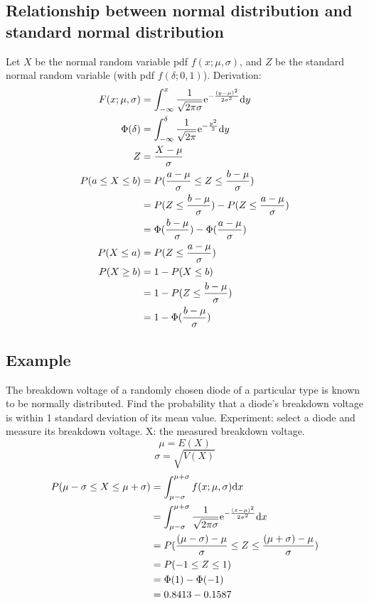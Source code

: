 \documentclass[letterpaper, 12pt]{math}
\begin{document}
\subsection*{Relationship between normal distribution and standard normal
             distribution}
Let \( X \) be the normal random variable pdf \( f(x;\mu,\sigma) \), and
\( Z \) be the standard normal random variable (with pdf \( f(\delta;0,1) \)).
Derivation:
\begin{align*}
  F(x;\mu,\sigma) &= \int_{-\infty}^{x}\frac{1}{\sqrt{2\pi\sigma}}
    \mathrm{e}^{-\frac{(y-\mu)^{2}}{2\sigma^{2}}}\mathrm{d}{y} \\
  \Phi(\delta) &= \int_{-\infty}^{\delta}\frac{1}{\sqrt{2\pi}}
    \mathrm{e}^{-\frac{y^{2}}{2}}\mathrm{d}{y} \\
  Z &= \frac{X-\mu}{\sigma} \\
  P(a\leq X\leq b) &= P(\frac{a-\mu}{\sigma}\leq Z\leq\frac{b-\mu}{\sigma}) \\
  &= P(Z\leq\frac{b-\mu}{\sigma})-P(Z\leq\frac{a-\mu}{\sigma}) \\
  &= \Phi(\frac{b-\mu}{\sigma})-\Phi(\frac{a-\mu}{\sigma}) \\
  P(X\leq a) &= P(Z\leq\frac{a-\mu}{\sigma}) \\
  P(X\geq b) &= 1-P(X\leq b) \\
  &= 1-P(Z\leq\frac{b-\mu}{\sigma}) \\
  &= 1-\Phi(\frac{b-\mu}{\sigma})
\end{align*}

\subsection*{Example}
The breakdown voltage of a randomly chosen diode of a particular type is known
to be normally distributed. Find the probability that a diode's breakdown
voltage is within 1 standard deviation of its mean value. Experiment: select
a diode and measure its breakdown voltage. X: the measured breakdown voltage.
\[ \mu = E(X) \]
\[ \sigma = \sqrt{V(X)} \]
\begin{align*}
  P(\mu-\sigma\leq X\leq\mu+\sigma) &= \int_{\mu-\sigma}^{\mu+\sigma}
    f(x;\mu,\sigma)\mathrm{d}{x} \\
  &= \int_{\mu-\sigma}^{\mu+\sigma}\frac{1}{\sqrt{2\pi\sigma}}
    \mathrm{e}^{-\frac{(x-\mu)^{2}}{2\sigma^{2}}}\mathrm{d}{x} \\
  &= P(\frac{(\mu-\sigma)-\mu}{\sigma}\leq
    Z\leq\frac{(\mu+\sigma)-\mu}{\sigma}) \\
  &= P(-1\leq Z\leq1) \\
  &= \Phi(1)-\Phi(-1) \\
  &= 0.8413-0.1587
\end{align*}
\end{document}
